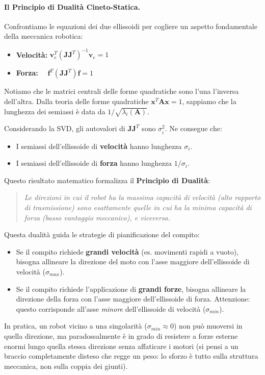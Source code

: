 ﻿\documentclass[11pt, a4paper]{article}
\begin{document}
\paragraph{Il Principio di Dualità Cineto-Statica.}
Confrontiamo le equazioni dei due ellissoidi per cogliere un aspetto fondamentale della meccanica robotica:
\begin{itemize}
    \item \textbf{Velocità:} $\bm{v}_e^T \left( \bm{J}\bm{J}^T \right)^{-1} \bm{v}_e = 1$
    \item \textbf{Forza:} $\quad \bm{f}^T \left( \bm{J}\bm{J}^T \right) \bm{f} = 1$
\end{itemize}
Notiamo che le matrici centrali delle forme quadratiche sono l'una l'inversa dell'altra.
Dalla teoria delle forme quadratiche $\bm{x}^T\bm{A}\bm{x}=1$, sappiamo che la lunghezza dei semiassi è data da $1/\sqrt{\lambda_i(\bm{A})}$.

Considerando la SVD, gli autovalori di $\bm{J}\bm{J}^T$ sono $\sigma_i^2$. Ne consegue che:
\begin{itemize}
    \item I semiassi dell'ellissoide di \textbf{velocità} hanno lunghezza $\sigma_i$.
    \item I semiassi dell'ellissoide di \textbf{forza} hanno lunghezza $1/\sigma_i$.
\end{itemize}
Questo risultato matematico formalizza il \textbf{Principio di Dualità}:
\begin{quote}
    \emph{Le direzioni in cui il robot ha la massima capacità di velocità (alto rapporto di trasmissione) sono esattamente quelle in cui ha la minima capacità di forza (basso vantaggio meccanico), e viceversa.}
\end{quote}

Questa dualità guida le strategie di pianificazione del compito:
\begin{itemize}
    \item Se il compito richiede \textbf{grandi velocità} (es. movimenti rapidi a vuoto), bisogna allineare la direzione del moto con l'asse maggiore dell'ellissoide di velocità ($\sigma_{max}$).
    \item Se il compito richiede l'applicazione di \textbf{grandi forze}, bisogna allineare la direzione della forza con l'asse maggiore dell'ellissoide di forza. Attenzione: questo corrisponde all'asse \textit{minore} dell'ellissoide di velocità ($\sigma_{min}$).
\end{itemize}
In pratica, un robot vicino a una singolarità ($\sigma_{min} \approx 0$) non può muoversi in quella direzione, ma paradossalmente è in grado di resistere a forze esterne enormi lungo quella stessa direzione senza affaticare i motori (si pensi a un braccio completamente disteso che regge un peso: lo sforzo è tutto sulla struttura meccanica, non sulla coppia dei giunti).
\end{document}
